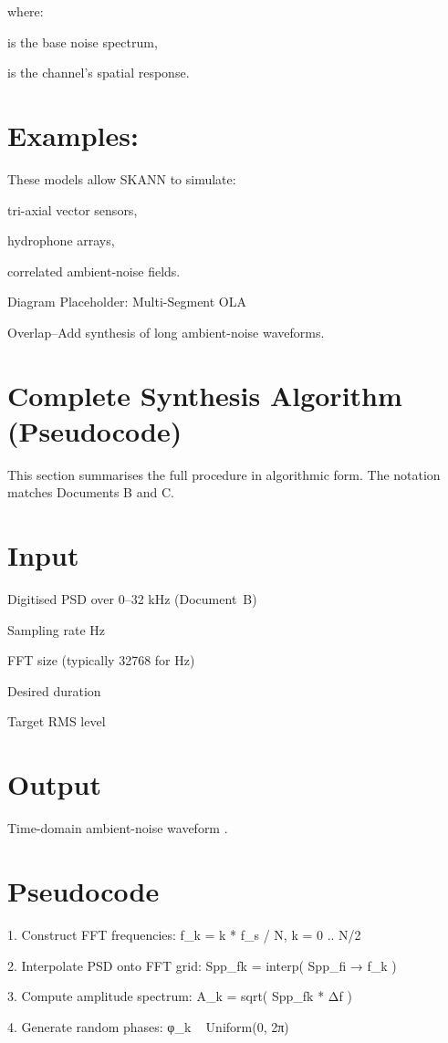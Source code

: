 \documentclass[12pt]{article}
\begin{document}
where:

is the base noise spectrum,

is the channel’s spatial response.

\section*{Examples:}

These models allow SKANN to simulate:

tri-axial vector sensors,

hydrophone arrays,

correlated ambient-noise fields.

Diagram Placeholder: Multi-Segment OLA

Overlap–Add synthesis of long ambient-noise waveforms.

\section*{Complete Synthesis Algorithm (Pseudocode)}
This section summarises the full procedure in algorithmic form. The notation matches Documents B and C.

\section*{Input}
Digitised PSD  over 0–32 kHz (Document B)

Sampling rate  Hz

FFT size  (typically 32768 for  Hz)

Desired duration

Target RMS level

\section*{Output}
Time-domain ambient-noise waveform .

\section*{Pseudocode}
1. Construct FFT frequencies:
       f_k = k * f_s / N,       k = 0 .. N/2

2. Interpolate PSD onto FFT grid:
       Spp_fk = interp( Spp_fi → f_k )

3. Compute amplitude spectrum:
       A_k = sqrt( Spp_fk * Δf )

4. Generate random phases:
       φ_k ~ Uniform(0, 2π)
\end{document}
